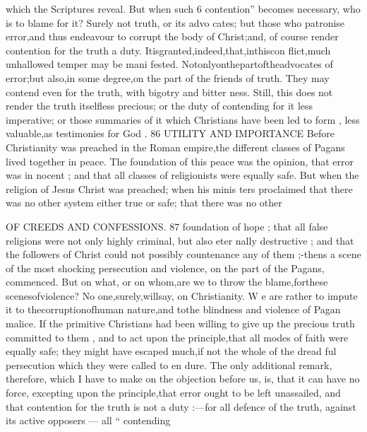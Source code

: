 \documentclass[
]{book}
\begin{document}
which the Scriptures reveal. But when such 6 contention'' becomes necessary, who is to
blame for it? Surely not truth, or its advo cates; but those who patronise error,and thus
endeavour to corrupt the body of Christ;and, of course render contention for the truth a
duty. Itisgranted,indeed,that,inthiscon flict,much unhallowed temper may be mani fested. Notonlyonthepartoftheadvocates of error;but also,in some degree,on the part of the friends of truth. They may contend even for the truth, with bigotry and bitter ness. Still, this does not render the truth
itselfless precious; or the duty of contending for it less imperative; or those summaries of it which Christians have been led to form , less valuable,as testimonies for God .
86 UTILITY AND IMPORTANCE
Before Christianity was preached in the
Roman empire,the different classes of Pagans lived together in peace. The foundation of
this peace was the opinion, that error was in nocent ; and that all classes of religionists were equally safe. But when the religion of Jesus Christ was preached; when his minis ters proclaimed that there was no other system
either true or safe; that there was no other

OF CREEDS AND CONFESSIONS. 87
foundation of hope ; that all false religions were not only highly criminal, but also eter nally destructive ; and that the followers of
Christ could not possibly countenance any of
them ;-thens a scene of the most shocking
persecution and violence, on the part of the
Pagans, commenced. But on what, or on
whom,are we to throw the blame,forthese
scenesofviolence? No one,surely,willsay,
on Christianity. W e are rather to impute it
to thecorruptionofhuman nature,and tothe
blindness and violence of Pagan malice. If
the primitive Christians had been willing to
give up the precious truth committed to them ,
and to act upon the principle,that all modes
of faith were equally safe; they might have
escaped much,if not the whole of the dread
ful persecution which they were called to en dure.
The only additional remark, therefore, which I have to make on the objection before us, is, that it can have no force, excepting upon the principle,that error ought to be left unassailed, and that contention for the truth
is not a duty :---for all defence of the truth, against its active opposers --- all `` contending
\end{document}
